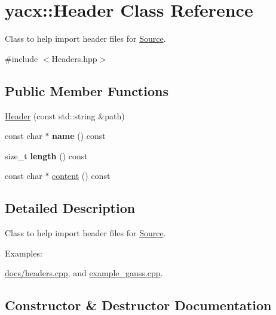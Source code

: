 \hypertarget{classyacx_1_1_header}{}\section{yacx\+:\+:Header Class Reference}
\label{classyacx_1_1_header}


Class to help import header files for \hyperlink{classyacx_1_1_source}{Source}.  




{\ttfamily \#include $<$Headers.\+hpp$>$}

\subsection*{Public Member Functions}
\begin{DoxyCompactItemize}
\item 
\hyperlink{classyacx_1_1_header_a359314e42c557b67be2ff790463f4f83}{Header} (const std\+::string \&path)
\item 
\mbox{\label{classyacx_1_1_header_a76c4a02acb1d5fcc7689529c555aa578}} 
const char $\ast$ {\bfseries name} () const
\item 
\mbox{\label{classyacx_1_1_header_a4ff84507d1e3af182e612420d0a4f79e}} 
size\+\_\+t {\bfseries length} () const
\item 
const char $\ast$ \hyperlink{classyacx_1_1_header_a6c16e8736a35b1644dfdf9caebee7ad5}{content} () const
\end{DoxyCompactItemize}


\subsection{Detailed Description}
Class to help import header files for \hyperlink{classyacx_1_1_source}{Source}. \begin{Desc}
\item[Examples\+: ]\par
\hyperlink{docs_2headers_8cpp-example}{docs/headers.\+cpp}, and \hyperlink{example_gauss_8cpp-example}{example\+\_\+gauss.\+cpp}.\end{Desc}


\subsection{Constructor \& Destructor Documentation}
\mbox{\label{classyacx_1_1_header_a359314e42c557b67be2ff790463f4f83}} 
